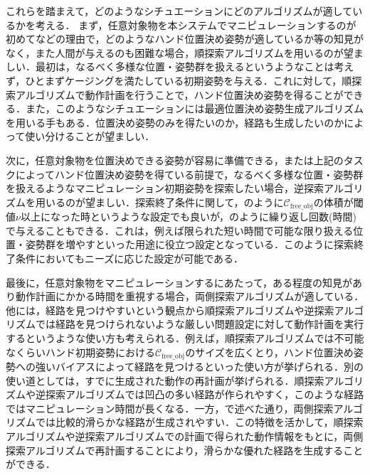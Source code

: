 \documentclass[a4paper,twoside,12pt,papersize, dvipdfmx]{iirthesis}
\begin{document}
これらを踏まえて，どのようなシチュエーションにどのアルゴリズムが適しているかを考える．
まず，任意対象物を本システムでマニピュレーションするのが初めてなどの理由で，どのようなハンド位置決め姿勢が適しているか等の知見がなく，また人間が与えるのも困難な場合，順探索アルゴリズムを用いるのが望ましい．最初は，なるべく多様な位置・姿勢群を扱えるというようなことは考えず，ひとまずケージングを満たしている初期姿勢を与える．これに対して，順探索アルゴリズムで動作計画を行うことで，ハンド位置決め姿勢を得ることができる．また，このようなシチュエーションには最適位置決め姿勢生成アルゴリズムを用いる手もある．位置決め姿勢のみを得たいのか，経路も生成したいのかによって使い分けることが望ましい．\par
次に，任意対象物を位置決めできる姿勢が容易に準備できる，または上記のタスクによってハンド位置決め姿勢を得ている前提で，なるべく多様な位置・姿勢群を扱えるようなマニピュレーション初期姿勢を探索したい場合，逆探索アルゴリズムを用いるのが望ましい．探索終了条件に関して，のように$\mathcal{C}_{\mathrm{free\_obj}}$の体積が閾値$\nu$以上になった時というような設定でも良いが，のように繰り返し回数(時間)で与えることもできる．これは，例えば限られた短い時間で可能な限り扱える位置・姿勢群を増やすといった用途に役立つ設定となっている．このように探索終了条件においてもニーズに応じた設定が可能である．\par
最後に，任意対象物をマニピュレーションするにあたって，ある程度の知見があり動作計画にかかる時間を重視する場合，両側探索アルゴリズムが適している．他には，経路を見つけやすいという観点から順探索アルゴリズムや逆探索アルゴリズムでは経路を見つけられないような厳しい問題設定に対して動作計画を実行するというような使い方も考えられる．例えば，順探索アルゴリズムでは不可能なくらいハンド初期姿勢における$\mathcal{C}_{\mathrm{free\_obj}}$のサイズを広くとり，ハンド位置決め姿勢への強いバイアスによって経路を見つけるといった使い方が挙げられる．別の使い道としては，すでに生成された動作の再計画が挙げられる．順探索アルゴリズムや逆探索アルゴリズムでは凹凸の多い経路が作られやすく，このような経路ではマニピュレーション時間が長くなる．一方，で述べた通り，両側探索アルゴリズムでは比較的滑らかな経路が生成されやすい．この特徴を活かして，順探索アルゴリズムや逆探索アルゴリズムでの計画で得られた動作情報をもとに，両側探索アルゴリズムで再計画することにより，滑らかな優れた経路を生成することができる．\par
\end{document}
